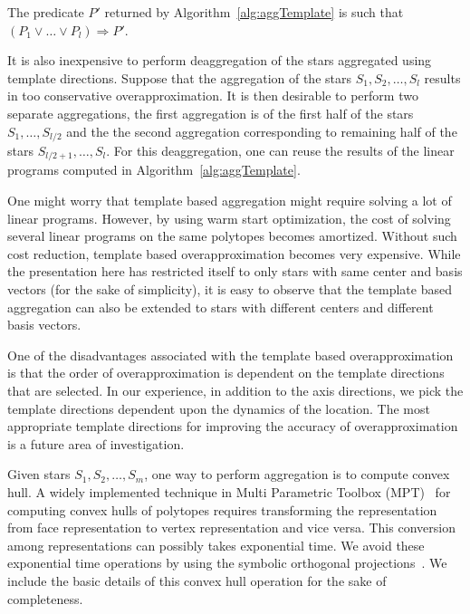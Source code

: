 \begin{lemma}
The predicate $P'$ returned by Algorithm~\ref{alg:aggTemplate} is such that $(P_1 \vee \ldots \vee P_l) \Rightarrow P'$.
\end{lemma}

It is also inexpensive to perform deaggregation of the stars aggregated using template directions. 
%
Suppose that the aggregation of the stars $S_1, S_2, \ldots, S_l$ results in too conservative overapproximation. 
%
It is then desirable to perform two separate aggregations, the first aggregation is of the first half of the stars $S_1, \ldots, S_{l/2}$ and the the second aggregation corresponding to remaining half of the stars $S_{l/2+1}, \ldots, S_{l}$. 
%
For this deaggregation, one can reuse the results of the linear programs computed in Algorithm~\ref{alg:aggTemplate}.

One might worry that template based aggregation might require solving a lot of linear programs. 
%
However, by using warm start optimization, the cost of solving several linear programs on the same polytopes becomes amortized. 
%
Without such cost reduction, template based overapproximation becomes very expensive. 
%
While the presentation here has restricted itself to only stars with same center and basis vectors (for the sake of simplicity), it is easy to observe that the template based aggregation can also be extended to stars with different centers and different basis vectors.

One of the disadvantages associated with the template based overapproximation is that the order of overapproximation is dependent on the template directions that are selected. In our experience, in addition to the axis directions, we pick the template directions dependent upon the dynamics of the location. The most appropriate template directions for improving the accuracy of overapproximation is a future area of investigation.

Given stars $S_1, S_2, \ldots, S_m$, one way to perform aggregation is to compute convex hull. 
%
A widely implemented technique in Multi Parametric Toolbox (MPT)~\cite{kvasnica2004multi} for computing convex hulls of polytopes requires transforming the representation from face representation to vertex representation and vice versa. 
%
This conversion among representations can possibly takes exponential time. 
%
We avoid these exponential time operations by using the symbolic orthogonal projections~\cite{hagemann2014reachability}. 
%
We include the basic details of this convex hull operation for the sake of completeness.

